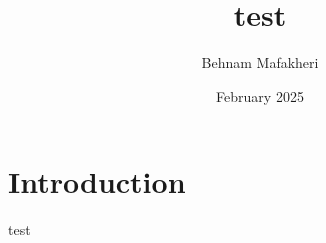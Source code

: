 \documentclass{article}
\title{test}
\author{Behnam Mafakheri}
\date{February 2025}
\begin{document}
\maketitle

\section{Introduction}
test
\end{document}
